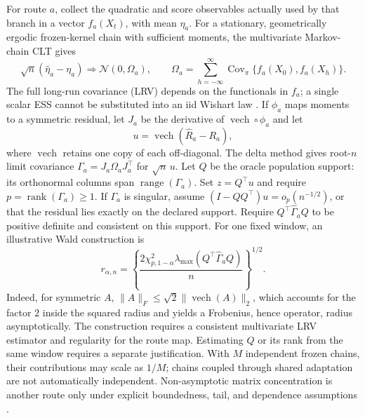 \documentclass[11pt]{article}
\theoremstyle{plain}
\theoremstyle{definition}
\theoremstyle{remark}
\begin{document}
For route $a$, collect the quadratic and score observables actually used by
that branch in a vector $f_a(X_t)$, with mean $\eta_a$. For a stationary,
geometrically ergodic frozen-kernel chain with sufficient moments, the
multivariate Markov-chain CLT gives
\begin{equation}
 \sqrt n(\widehat\eta_a-\eta_a)
 \Rightarrow\mathcal N(0,\Omega_a),\qquad
 \Omega_a=\sum_{h=-\infty}^{\infty}
 \operatorname{Cov}_\pi\{f_a(X_0),f_a(X_h)\}.                 \label{eq:mclt}
\end{equation}
The full long-run covariance (LRV) depends on the functionals in $f_a$; a
single scalar ESS cannot be substituted into an iid Wishart law
\citep{jones2004markov,vats2018strong}.
If $\phi_a$ maps moments to a symmetric residual, let $J_a$ be the derivative
of $\operatorname{vech}\circ\phi_a$ and let
\[
 u=\operatorname{vech}(\widehat R_a-R_a),
\]
where $\operatorname{vech}$ retains one copy of each off-diagonal. The delta
method gives root-$n$ limit covariance
$\Gamma_a=J_a\Omega_aJ_a^\top$ for $\sqrt n\,u$. Let $Q$ be the oracle
population support: its orthonormal columns span
$\operatorname{range}(\Gamma_a)$. Set $z=Q^\top u$ and require
$p=\operatorname{rank}(\Gamma_a)\ge1$. If $\Gamma_a$ is singular, assume
$(I-QQ^\top)u=o_p(n^{-1/2})$, or that the residual lies exactly on the declared
support. Require
$Q^\top\widehat\Gamma_aQ$ to be positive definite and consistent on this
support. For one fixed window, an illustrative Wald construction is
\begin{equation}
 r_{\alpha,n}=
 \left\{\frac{2\chi^2_{p,1-\alpha}
 \lambda_{\max}(Q^\top\widehat\Gamma_aQ)}{n}\right\}^{1/2}.   \label{eq:radius}
\end{equation}
Indeed, for symmetric $A$,
$\|A\|_F\le\sqrt{2}\|\operatorname{vech}(A)\|_2$, which accounts
for the factor $2$ inside the squared radius and yields a Frobenius, hence
operator, radius asymptotically. The construction requires a consistent
multivariate LRV estimator and regularity for the route map. Estimating $Q$ or
its rank from the same window requires a separate justification. With $M$
independent frozen chains, their contributions may scale as $1/M$; chains
coupled through shared adaptation are not automatically independent.
Non-asymptotic matrix concentration is another route only under explicit
boundedness, tail, and dependence assumptions \citep{neeman2024concentration}.
\end{document}
